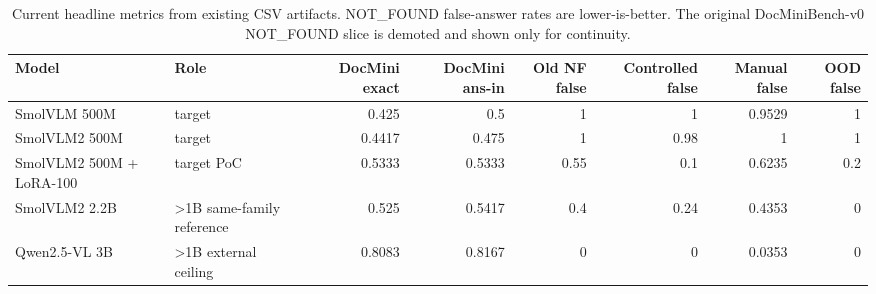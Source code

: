 \begin{table}[t]
\centering
\small
\begin{tabular}{llrrrrrr}
\hline
Model & Role & DocMini exact & DocMini ans-in & Old NF false & Controlled false & Manual false & OOD false \\
\hline
SmolVLM 500M & target & 0.425 & 0.5 & 1 & 1 & 0.9529 & 1 \\
SmolVLM2 500M & target & 0.4417 & 0.475 & 1 & 0.98 & 1 & 1 \\
SmolVLM2 500M + LoRA-100 & target PoC & 0.5333 & 0.5333 & 0.55 & 0.1 & 0.6235 & 0.2 \\
SmolVLM2 2.2B & >1B same-family reference & 0.525 & 0.5417 & 0.4 & 0.24 & 0.4353 & 0 \\
Qwen2.5-VL 3B & >1B external ceiling & 0.8083 & 0.8167 & 0 & 0 & 0.0353 & 0 \\
\hline
\end{tabular}
\caption{Current headline metrics from existing CSV artifacts. NOT\_FOUND false-answer rates are lower-is-better. The original DocMiniBench-v0 NOT\_FOUND slice is demoted and shown only for continuity.}
\label{tab:headline-results}
\end{table}
